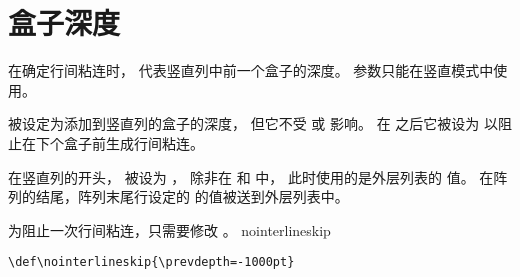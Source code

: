 \documentclass{book}
\begin{document}
\section{盒子深度}

在确定行间粘连时， 代表竖直列中前一个盒子的深度。
 参数只能在竖直模式中使用。

 被设定为添加到竖直列的盒子的深度，
但它不受  或  影响。
在  之后它被设为 \n{-1000pt} 以阻止在下个盒子前生成行间粘连。

在竖直列的开头， 被设为 \n{-1000pt}，
除非在  和  中，
此时使用的是外层列表的  值。
在阵列的结尾，阵列末尾行设定的  的值被送到外层列表中。

为阻止一次行间粘连，只需要修改 。
\cstoidx nointerlineskip\par
\begin{verbatim}
\def\nointerlineskip{\prevdepth=-1000pt}
\end{verbatim}
\end{document}

